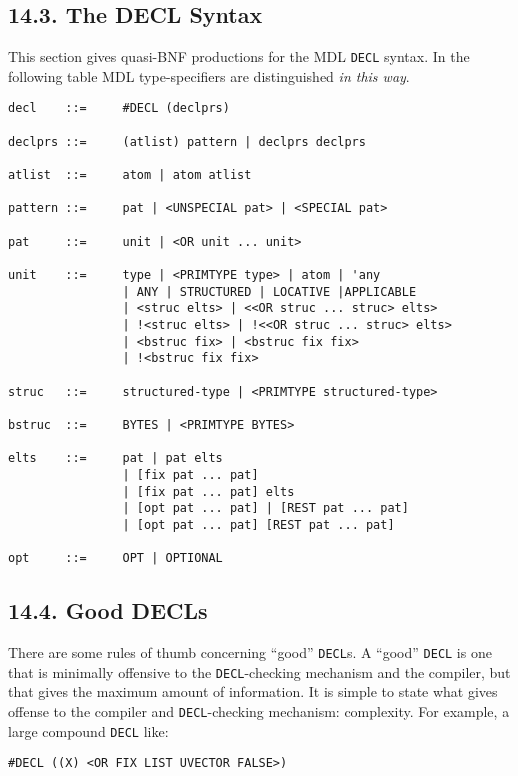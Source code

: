 \documentclass[a4paper,]{article}
\begin{document}
\subsection{14.3. The DECL Syntax}\label{the-decl-syntax}

This section gives quasi-BNF productions for the MDL \texttt{DECL} syntax. In the following table MDL type-specifiers are
distinguished \emph{in this way}.

\begin{verbatim}
decl    ::=     #DECL (declprs)

declprs ::=     (atlist) pattern | declprs declprs

atlist  ::=     atom | atom atlist

pattern ::=     pat | <UNSPECIAL pat> | <SPECIAL pat>

pat     ::=     unit | <OR unit ... unit>

unit    ::=     type | <PRIMTYPE type> | atom | 'any
                | ANY | STRUCTURED | LOCATIVE |APPLICABLE
                | <struc elts> | <<OR struc ... struc> elts>
                | !<struc elts> | !<<OR struc ... struc> elts>
                | <bstruc fix> | <bstruc fix fix>
                | !<bstruc fix fix>

struc   ::=     structured-type | <PRIMTYPE structured-type>

bstruc  ::=     BYTES | <PRIMTYPE BYTES>

elts    ::=     pat | pat elts
                | [fix pat ... pat]
                | [fix pat ... pat] elts
                | [opt pat ... pat] | [REST pat ... pat]
                | [opt pat ... pat] [REST pat ... pat]

opt     ::=     OPT | OPTIONAL
\end{verbatim}

\subsection{14.4. Good DECLs}\label{good-decls}

There are some rules of thumb concerning ``good'' \texttt{DECL}s. A ``good'' \texttt{DECL} is one that is minimally
offensive to the \texttt{DECL}-checking mechanism and the compiler, but that gives the maximum amount of information. It is
simple to state what gives offense to the compiler and \texttt{DECL}-checking mechanism: complexity. For example, a large
compound \texttt{DECL} like:

\begin{verbatim}
#DECL ((X) <OR FIX LIST UVECTOR FALSE>)
\end{verbatim}
\end{document}

